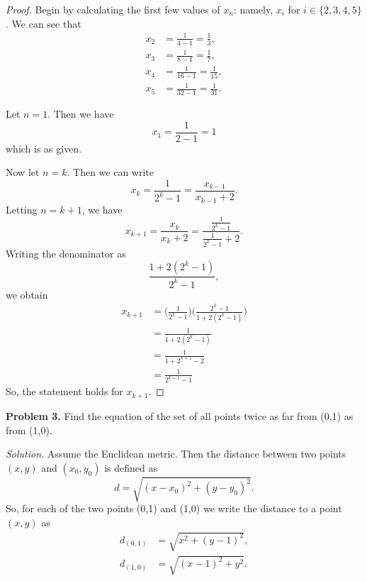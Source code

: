 \documentclass[12pt]{amsart}
\theoremstyle{case}
\begin{document}
	\begin{proof}
		Begin by calculating the first few values of $x_n$: namely, $x_i$ for $i \in \{2,3,4,5\}$.
		We can see that
		\begin{equation*}
		\begin{split}
		x_2 & = \frac{1}{4-1} = \frac{1}{3}, \\ x_3 & = \frac{1}{8-1} = \frac{1}{7}, \\ x_4 & = \frac{1}{16-1} = \frac{1}{15}, \\ x_5 & = \frac{1}{32-1} = \frac{1}{31} .
		\end{split}
		\end{equation*}
		
		Let $n=1$. Then we have
		$$x_1 = \frac{1}{2-1} = 1$$
		which is as given.
		
		Now let $n=k$. Then we can write
		$$ x_k = \frac{1}{2^k - 1} = \frac{x_{k-1}}{x_{k-1}+2}.$$
		Letting $n=k+1$, we have
		$$ x_{k+1} = \frac{x_k}{x_k + 2} = \frac{\frac{1}{2^k-1}}{\frac{1}{2^k - 1} + 2} . $$
		Writing the denominator as
		$$\frac{1+2(2^k-1)}{2^k-1} , $$
		we obtain
		\begin{equation*}
		\begin{split}
		x_{k+1} & = \Big( \frac{1}{2^k -1} \Big) \Big( \frac{2^k-1}{1+2(2^k-1)} \Big) \\
		& = \frac{1}{1+2(2^k-1)} \\
		& = \frac{1}{1 + 2^{k+1} - 2} \\
		& = \frac{1}{2^{k+1} - 1}
		\end{split}
		\end{equation*}
		So, the statement holds for $x_{k+1}$.
	\end{proof}
	
	\noindent \textbf{Problem 3.} Find the equation of the set of all points twice as far from (0,1) as from (1,0).
	
	\noindent \textit{Solution.}
		Assume the Euclidean metric. Then the distance between two points $(x,y)$ and $(x_0,y_0)$ is defined as
		$$ d = \sqrt{(x-x_0)^2 + (y-y_0)^2} . $$
		So, for each of the two points (0,1) and (1,0) we write the distance to a point $(x,y)$ as
		\begin{equation*}
		\begin{split}
		d_{(0,1)} & = \sqrt{x^2 + (y-1)^2} , \\
		d_{(1,0)} & = \sqrt{(x-1)^2 + y^2} .
		\end{split}
		\end{equation*}
		
\end{document}
